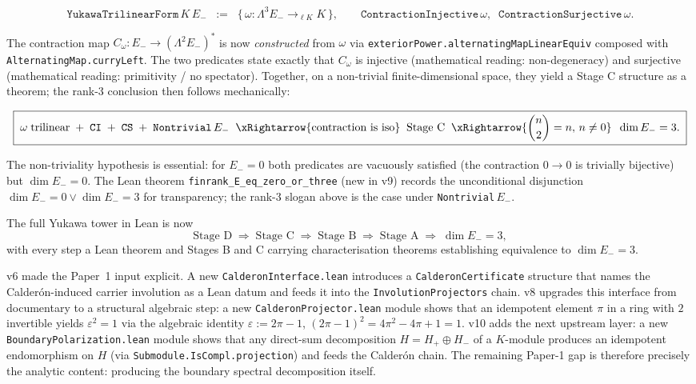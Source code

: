 \[
\texttt{YukawaTrilinearForm}\,K\,E_-
\;\;:=\;\;
\bigl\{\,\omega : \Lambda^3 E_- \to_{\ell K} K\,\bigr\},
\qquad
\texttt{ContractionInjective}\,\omega,\;\;
\texttt{ContractionSurjective}\,\omega.
\]

The contraction map $C_\omega : E_- \to (\Lambda^2 E_-)^*$ is
now \emph{constructed} from $\omega$ via
\texttt{exteriorPower.alternatingMapLinearEquiv} composed with
\texttt{AlternatingMap.curryLeft}. The two predicates state
exactly that $C_\omega$ is injective (mathematical reading:
non-degeneracy) and surjective (mathematical reading: primitivity
/ no spectator). Together, on a non-trivial finite-dimensional
space, they yield a Stage C structure as a theorem; the rank-3
conclusion then follows mechanically:

\[
\boxed{\;
\omega\;\text{trilinear} \;+\; \texttt{CI} \;+\; \texttt{CS} \;+\; \texttt{Nontrivial}\,E_-
\;\;\xRightarrow{\text{contraction is iso}}\;\;
\text{Stage C}
\;\;\xRightarrow{\binom{n}{2} = n,\, n\ne 0}\;\;
\dim E_- = 3.
\;}
\]

\noindent
The non-triviality hypothesis is essential: for $E_- = 0$ both
predicates are vacuously satisfied (the contraction $0 \to 0$ is
trivially bijective) but $\dim E_- = 0$. The Lean theorem
\texttt{finrank\_E\_eq\_zero\_or\_three} (new in v9) records the
unconditional disjunction $\dim E_- = 0 \lor \dim E_- = 3$ for
transparency; the rank-3 slogan above is the case under
\texttt{Nontrivial}\,$E_-$.

The full Yukawa tower in Lean is now
\[
\text{Stage D}
\;\Rightarrow\; \text{Stage C}
\;\Rightarrow\; \text{Stage B}
\;\Rightarrow\; \text{Stage A}
\;\Rightarrow\; \dim E_- = 3,
\]
with every step a Lean theorem and Stages B and C carrying
characterisation theorems establishing equivalence to
$\dim E_- = 3$.

v6 made the Paper~1 input explicit. A new
\texttt{CalderonInterface.lean} introduces a
\texttt{CalderonCertificate} structure that names the
Calder\'on-induced carrier involution as a Lean datum and feeds
it into the \texttt{InvolutionProjectors} chain. v8 upgrades
this interface from documentary to a structural algebraic step:
a new \texttt{CalderonProjector.lean} module shows that an
idempotent element $\pi$ in a ring with $2$ invertible yields
$\varepsilon^2 = 1$ via the algebraic identity $\varepsilon := 2\pi - 1$,
$(2\pi - 1)^2 = 4\pi^2 - 4\pi + 1 = 1$. v10 adds the next
upstream layer: a new \texttt{BoundaryPolarization.lean} module
shows that any direct-sum decomposition $H = H_+ \oplus H_-$
of a $K$-module produces an idempotent endomorphism on $H$ (via
\texttt{Submodule.IsCompl.projection}) and feeds the Calder\'on
chain. The remaining Paper-1 gap is therefore precisely the
analytic content: producing the boundary spectral
decomposition itself.

